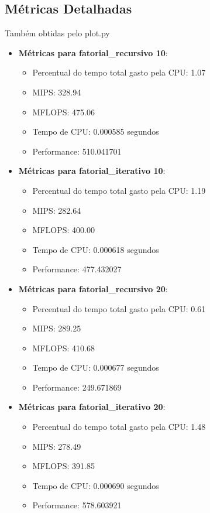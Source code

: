 \documentclass[12pt]{article}
\begin{document}
\subsection{Métricas Detalhadas}

Também obtidas pelo plot.py

\begin{itemize}
    \item \textbf{Métricas para fatorial\_recursivo 10}:
    \begin{itemize}
        \item Percentual do tempo total gasto pela CPU: 1.07
        \item MIPS: 328.94
        \item MFLOPS: 475.06
        \item Tempo de CPU: 0.000585 segundos
        \item Performance: 510.041701
    \end{itemize}

    \item \textbf{Métricas para fatorial\_iterativo 10}:
    \begin{itemize}
        \item Percentual do tempo total gasto pela CPU: 1.19
        \item MIPS: 282.64
        \item MFLOPS: 400.00
        \item Tempo de CPU: 0.000618 segundos
        \item Performance: 477.432027
    \end{itemize}

    \item \textbf{Métricas para fatorial\_recursivo 20}:
    \begin{itemize}
        \item Percentual do tempo total gasto pela CPU: 0.61
        \item MIPS: 289.25
        \item MFLOPS: 410.68
        \item Tempo de CPU: 0.000677 segundos
        \item Performance: 249.671869
    \end{itemize}

    \item \textbf{Métricas para fatorial\_iterativo 20}:
    \begin{itemize}
        \item Percentual do tempo total gasto pela CPU: 1.48
        \item MIPS: 278.49
        \item MFLOPS: 391.85
        \item Tempo de CPU: 0.000690 segundos
        \item Performance: 578.603921
    \end{itemize}


\end{itemize}
\end{document}
